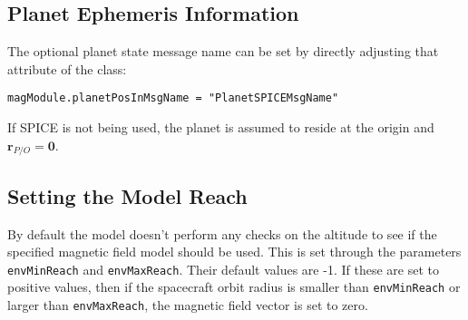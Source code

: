 \subsection{Planet Ephemeris Information}
The optional planet state message name can be set by directly adjusting that attribute of the class:
\begin{verbatim}
magModule.planetPosInMsgName = "PlanetSPICEMsgName"
\end{verbatim}
If SPICE is not being used, the planet is assumed to reside at the origin and $\bm r_{P/O} = \bm 0$.

\subsection{Setting the Model Reach}
By default the model doesn't perform any checks on the altitude to see if the specified magnetic field model should be used.  This is set through the parameters {\tt envMinReach} and {\tt envMaxReach}.  Their default values are -1.  If these are set to positive values, then if the spacecraft orbit radius is smaller than {\tt envMinReach} or larger than {\tt envMaxReach}, the magnetic field vector is set to zero.


